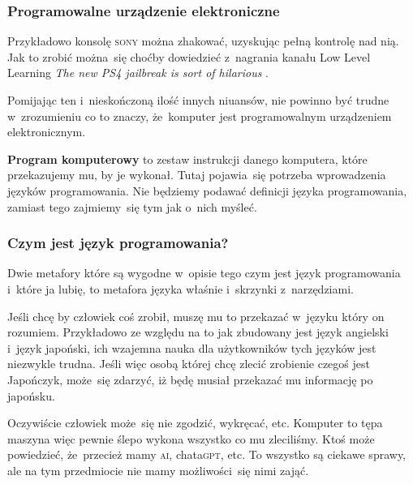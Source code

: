 \documentclass[10pt,t]{beamer}
\begin{document}
\begin{frame}
  \frametitle{Programowalne urządzenie elektroniczne}


  Przykładowo konsolę \textsc{sony} można zhakować, uzyskując pełną
  kontrolę nad nią. Jak to zrobić można~się choćby dowiedzieć z~nagrania
  kanału Low Level Learning
  {\textit{The new PS4 jailbreak is sort of hilarious}}
  \parencite{Low-Level-Learning-The-new-PS4-jailbreak-ETC-2024}.

  Pomijając ten i~nieskończoną ilość innych niuansów, nie powinno być
  trudne w~zrozumieniu co to znaczy, że~komputer jest programowalnym
  urządzeniem elektronicznym.

  \textbf{Program komputerowy} to zestaw instrukcji danego komputera, które
  przekazujemy mu, by je wykonał. Tutaj pojawia~się potrzeba wprowadzenia
  języków programowania. Nie będziemy podawać definicji języka
  programowania, zamiast tego zajmiemy~się tym jak o~nich myśleć.

\end{frame}





\begin{frame}
  \frametitle{Czym jest język programowania?}


  Dwie metafory które są wygodne w~opisie tego czym jest język
  programowania i~które ja lubię, to metafora języka właśnie i~skrzynki
  z~narzędziami.

  Jeśli chcę by człowiek coś zrobił, muszę mu to przekazać w~języku który
  on rozumiem. Przykładowo ze względu na to jak zbudowany jest język
  angielski i~język japoński, ich wzajemna nauka dla użytkowników tych
  języków jest niezwykle trudna. Jeśli więc osobą której chcę zlecić
  zrobienie czegoś jest Japończyk, może~się zdarzyć, iż będę musiał
  przekazać mu informację po japońsku.

  Oczywiście człowiek może~się nie zgodzić, wykręcać, etc. Komputer to
  tępa maszyna więc pewnie ślepo wykona wszystko co mu zleciliśmy. Ktoś
  może powiedzieć, że~przecież mamy \textsc{ai}, chata\textsc{gpt}, etc.
  To wszystko są ciekawe sprawy, ale na tym przedmiocie nie mamy
  możliwości~się nimi zająć.

\end{frame}
\end{document}
